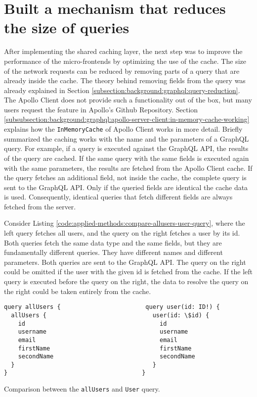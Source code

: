 \section{Built a mechanism that reduces the size of queries}\label{section:applied-methods:query-reduction}

After implementing the shared caching layer, the next step was to improve the performance of the micro-frontends by optimizing the use of the cache. The size of the network requests can be reduced by removing parts of a query that are already inside the cache. The theory behind removing fields from the query was already explained in Section \ref{subsection:background:graphql:query-reduction}. The Apollo Client does not provide such a functionality out of the box, but many users request the feature in Apollo's Github Repository. Section \ref{subsubsection:background:graphql:apollo-server-client:in-memory-cache-working} explains how the \texttt{InMemoryCache} of Apollo Client works in more detail. Briefly summarized the caching works with the name and the parameters of a GraphQL query. For example, if a query is executed against the GraphQL \ac{API}, the results of the query are cached. If the same query with the same fields is executed again with the same parameters, the results are fetched from the Apollo Client cache. If the query fetches an additional field, not inside the cache, the complete query is sent to the GraphQL \ac{API}. Only if the queried fields are identical the cache data is used. Consequently, identical queries that fetch different fields are always fetched from the server.

\bigskip

\noindent Consider Listing \ref{code:applied-methods:compare-allusers-user-query}, where the left query fetches all users, and the query on the right fetches a user by its id. Both queries fetch the same data type and the same fields, but they are fundamentally different queries. They have different names and different parameters. Both queries are sent to the GraphQL \ac{API}. The query on the right could be omitted if the user with the given id is fetched from the cache. If the left query is executed before the query on the right, the data to resolve the query on the right could be taken entirely from the cache.

\ifshowListings
\begin{listing}[H]
\begin{verbatim}
query allUsers {                        query user(id: ID!) {
  allUsers {                              user(id: \$id) {
    id                                      id
    username                                username
    email                                   email
    firstName                               firstName
    secondName                              secondName
  }                                       }
}                                      }
\end{verbatim}
\caption{Comparison between the \texttt{allUsers} and \texttt{User} query.}\label{code:applied-methods:compare-allusers-user-query}
\end{listing}
\fi


